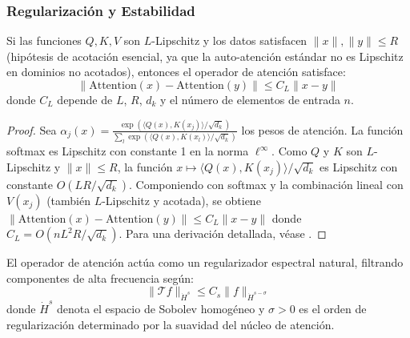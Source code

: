 \subsubsection{Regularización y Estabilidad}

\begin{proposition}\label{prop:lipschitz_stability_attention}
    Si las funciones $Q, K, V$ son $L$-Lipschitz y los datos satisfacen $\|x\|, \|y\| \leq R$ (hipótesis de acotación esencial, ya que la auto-atención estándar no es Lipschitz en dominios no acotados), entonces el operador de atención satisface:
    \begin{equation}
        \|\text{Attention}(x) - \text{Attention}(y)\| \leq C_L \|x - y\|
        \label{eq:lipschitz_bound_attention}
    \end{equation}
    donde $C_L$ depende de $L$, $R$, $d_k$ y el número de elementos de entrada $n$.
\end{proposition}

\begin{proof}
Sea $\alpha_j(x) = \frac{\exp(\langle Q(x), K(x_j)\rangle / \sqrt{d_k})}{\sum_l \exp(\langle Q(x), K(x_l)\rangle / \sqrt{d_k})}$ los pesos de atención. La función softmax es Lipschitz con constante 1 en la norma $\ell^\infty$. Como $Q$ y $K$ son $L$-Lipschitz y $\|x\| \leq R$, la función $x \mapsto \langle Q(x), K(x_j)\rangle / \sqrt{d_k}$ es Lipschitz con constante $O(LR/\sqrt{d_k})$. Componiendo con softmax y la combinación lineal con $V(x_j)$ (también $L$-Lipschitz y acotada), se obtiene $\|\text{Attention}(x) - \text{Attention}(y)\| \leq C_L \|x - y\|$ donde $C_L = O(nL^2R/\sqrt{d_k})$. Para una derivación detallada, véase \citep{kim2021lipschitz}.
\end{proof}

\begin{theorem}\label{theorem:spectral_regularization}
    El operador de atención actúa como un regularizador espectral natural, filtrando componentes de alta frecuencia según:
    \begin{equation}
        \|\mathcal{T}f\|_{\dot{H}^s} \leq C_s \|f\|_{\dot{H}^{s-\sigma}}
        \label{eq:spectral_regularization}
    \end{equation}
    donde $\dot{H}^s$ denota el espacio de Sobolev homogéneo y $\sigma > 0$ es el orden de regularización determinado por la suavidad del núcleo de atención.
\end{theorem}

